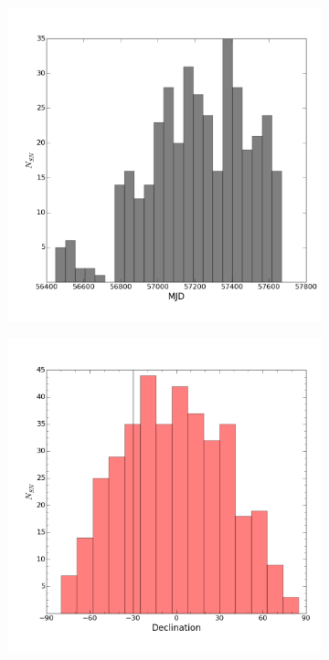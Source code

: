 \documentclass[aps,prb,twocolumn,superscriptaddress]{revtex4-1}
\begin{document}
\begin{figure}
  \centering
  \begin{subfigure}{.5\textwidth}
    \centering
    \includegraphics[width=1\linewidth]{figures/peak_mjd_histo_step50.png}
    \caption{\it \small{ }}
    \label{fig:mjdhist}
  \end{subfigure}%
  \begin{subfigure}{.5\textwidth}
    \centering
      \includegraphics[width=1\linewidth]{figures/dec_histo_step10.png}

\end{subfigure}
\end{figure}
\end{document}
